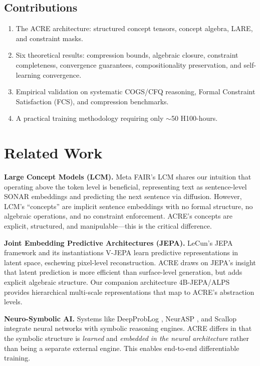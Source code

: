 \documentclass{article}
\begin{document}
\subsection{Contributions}

\begin{enumerate}[leftmargin=*]
    \item The ACRE architecture: structured concept tensors, concept algebra, LARE, and constraint masks.
    \item Six theoretical results: compression bounds, algebraic closure, constraint completeness, convergence guarantees, compositionality preservation, and self-learning convergence.
    \item Empirical validation on systematic COGS/CFQ reasoning, Formal Constraint Satisfaction (FCS), and compression benchmarks.
    \item A practical training methodology requiring only $\sim$50 H100-hours.
\end{enumerate}

\section{Related Work}

\textbf{Large Concept Models (LCM).} Meta FAIR's LCM \citep{meta2024lcm} shares our intuition that operating above the token level is beneficial, representing text as sentence-level SONAR embeddings and predicting the next sentence via diffusion. However, LCM's ``concepts'' are implicit sentence embeddings with no formal structure, no algebraic operations, and no constraint enforcement. ACRE's concepts are explicit, structured, and manipulable---this is the critical difference.

\textbf{Joint Embedding Predictive Architectures (JEPA).} LeCun's JEPA framework \citep{lecun2022path} and its instantiations V-JEPA \citep{bardes2024revisiting, klindt2026when} learn predictive representations in latent space, eschewing pixel-level reconstruction. ACRE draws on JEPA's insight that latent prediction is more efficient than surface-level generation, but adds explicit algebraic structure. Our companion architecture 4B-JEPA/ALPS provides hierarchical multi-scale representations that map to ACRE's abstraction levels.

\textbf{Neuro-Symbolic AI.} Systems like DeepProbLog \citep{manhaeve2021deepproblog}, NeurASP \citep{yang2020neurasp}, and Scallop \citep{li2024scallop} integrate neural networks with symbolic reasoning engines. ACRE differs in that the symbolic structure is \emph{learned} and \emph{embedded in the neural architecture} rather than being a separate external engine. This enables end-to-end differentiable training.
\end{document}

